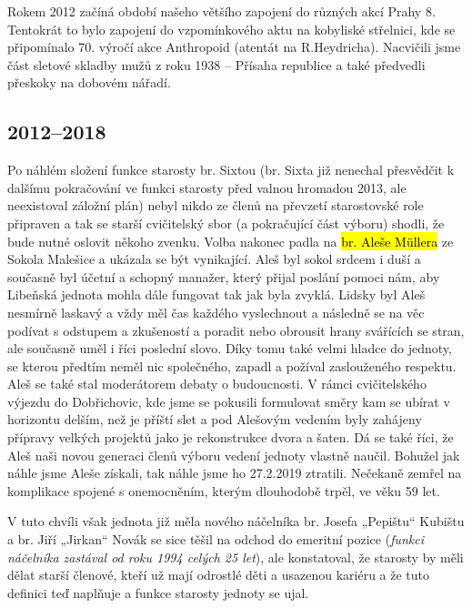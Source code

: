 Rokem 2012 začíná období našeho většího zapojení do různých akcí Prahy
8. Tentokrát to bylo zapojení do vzpomínkového aktu na kobyliské
střelnici, kde se připomínalo 70. výročí akce Anthropoid (atentát na
R.Heydricha). Nacvičili jsme část sletové skladby mužů z roku 1938 --
Přísaha republice a také předvedli přeskoky na dobovém nářadí.

\subsection{\texorpdfstring{2012--2018 }{2012--2018 }}\label{section-2}

Po náhlém složení funkce starosty br. Sixtou (br. Sixta již nenechal
přesvědčit k dalšímu pokračování ve funkci starosty před valnou hromadou
2013, ale neexistoval záložní plán) nebyl nikdo ze členů na převzetí
starostovské role připraven a tak se starší cvičitelský sbor (a
pokračující část výboru) shodli, že bude nutné oslovit někoho zvenku.
Volba nakonec padla na \hl{br. Aleše Müllera} ze Sokola Malešice a
ukázala se být vynikající. Aleš byl sokol srdcem i duší a současně byl
účetní a schopný manažer, který přijal poslání pomoci nám, aby Libeňská
jednota mohla dále fungovat tak jak byla zvyklá. Lidsky byl Aleš
nesmírně laskavý a vždy měl čas každého vyslechnout a následně se na věc
podívat s odstupem a zkušeností a poradit nebo obrousit hrany svářících
se stran, ale současně uměl i říci poslední slovo. Díky tomu také velmi
hladce do jednoty, se kterou předtím neměl nic společného, zapadl a
požíval zaslouženého respektu. Aleš se také stal moderátorem debaty o
budoucnosti. V rámci cvičitelského výjezdu do Dobřichovic, kde jsme se
pokusili formulovat směry kam se ubírat v horizontu delším, než je
příští slet a pod Alešovým vedením byly zahájeny přípravy velkých
projektů jako je rekonstrukce dvora a šaten. Dá se také říci, že Aleš
naši novou generaci členů výboru vedení jednoty vlastně naučil. Bohužel
jak náhle jsme Aleše získali, tak náhle jsme ho 27.2.2019 ztratili.
Nečekaně zemřel na komplikace spojené s onemocněním, kterým dlouhodobě
trpěl, ve věku 59 let.

V tuto chvíli však jednota již měla nového náčelníka br. Josefa
„Pepištu`` Kubištu a br. Jiří „Jirkan`` Novák se sice těšil na odchod do
emeritní pozice (\emph{funkci náčelníka zastával od roku 1994 celých 25
let}), ale konstatoval, že starosty by měli dělat starší členové, kteří
už mají odrostlé děti a usazenou kariéru a že tuto definici teď naplňuje
a funkce starosty jednoty se ujal.

